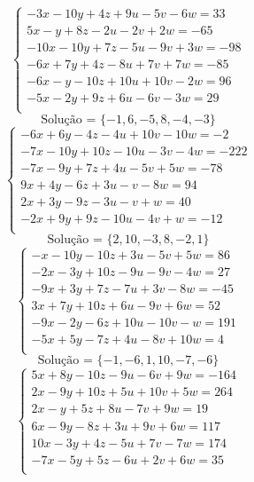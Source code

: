 \documentclass[12pt,oneside,a4paper]{article}
\begin{document}
\vspace{\baselineskip}
\begin{equation*}
\begin{cases}
-3x-10y+4z+9u-5v-6w=33 \\
5x-y+8z-2u-2v+2w=-65 \\
-10x-10y+7z-5u-9v+3w=-98 \\
-6x+7y+4z-8u+7v+7w=-85 \\
-6x-y-10z+10u+10v-2w=96 \\
-5x-2y+9z+6u-6v-3w=29 \\
\end{cases}
\end{equation*}
\begin{equation*}
\text{Solução = }\{-1,6,-5,8,-4,-3\}
\end{equation*}
\vspace{\baselineskip}
\begin{equation*}
\begin{cases}
-6x+6y-4z-4u+10v-10w=-2 \\
-7x-10y+10z-10u-3v-4w=-222 \\
-7x-9y+7z+4u-5v+5w=-78 \\
9x+4y-6z+3u-v-8w=94 \\
2x+3y-9z-3u-v+w=40 \\
-2x+9y+9z-10u-4v+w=-12 \\
\end{cases}
\end{equation*}
\begin{equation*}
\text{Solução = }\{2,10,-3,8,-2,1\}
\end{equation*}
\vspace{\baselineskip}
\begin{equation*}
\begin{cases}
-x-10y-10z+3u-5v+5w=86 \\
-2x-3y+10z-9u-9v-4w=27 \\
-9x+3y+7z-7u+3v-8w=-45 \\
3x+7y+10z+6u-9v+6w=52 \\
-9x-2y-6z+10u-10v-w=191 \\
-5x+5y-7z+4u-8v+10w=4 \\
\end{cases}
\end{equation*}
\begin{equation*}
\text{Solução = }\{-1,-6,1,10,-7,-6\}
\end{equation*}
\vspace{\baselineskip}
\begin{equation*}
\begin{cases}
5x+8y-10z-9u-6v+9w=-164 \\
2x-9y+10z+5u+10v+5w=264 \\
2x-y+5z+8u-7v+9w=19 \\
6x-9y-8z+3u+9v+6w=117 \\
10x-3y+4z-5u+7v-7w=174 \\
-7x-5y+5z-6u+2v+6w=35 \\
\end{cases}
\end{equation*}
\end{document}
